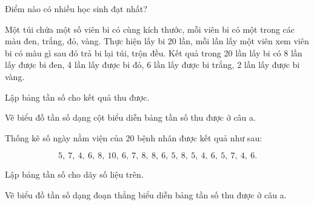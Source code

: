 \begin{practice}
\begin{questions}[series=SBT]
\begin{questions}
            \item Điểm nào có nhiều học sinh đạt nhất?

            \answerline
        \end{questions}

        \item Một túi chứa một số viên bi có cùng kích thước, mỗi viên bi có một trong các màu đen, trắng, đỏ, vàng. Thực hiện lấy bi 20 lần, mỗi lần lấy một viên xem viên bi có màu gì sau đó trả bi lại túi, trộn đều. Kết quả trong 20 lần lấy bi có 8 lần lấy được bi đen, 4 lần lấy được bi đỏ, 6 lần lấy được bi trắng, 2 lần lấy được bi vàng.

        \begin{questions}
            \item Lập bảng tần số cho kết quả thu được.

            \answerline
            \answerline

            \item Vẽ biểu đồ tần số dạng cột biểu diễn bảng tần số thu được ở câu a.

            \answerline
            \answerline
            \answerline
        \end{questions}

        \item Thống kê số ngày nằm viện của 20 bệnh nhân được kết quả như sau:

        \[
            5,\ 7,\ 4,\ 6,\ 8,\ 10,\ 6,\ 7,\ 8,\ 8,\ 6,\ 5,\ 8,\ 5,\ 4,\ 6,\ 5,\ 7,\ 4,\ 6.
        \]

        \begin{questions}
            \item Lập bảng tần số cho dãy số liệu trên.

            \answerline
            \answerline

            \item Vẽ biểu đồ tần số dạng đoạn thẳng biểu diễn bảng tần số thu được ở câu a.

            \answerline
            \answerline
            \answerline
        \end{questions}
    \end{questions}
\end{practice}
